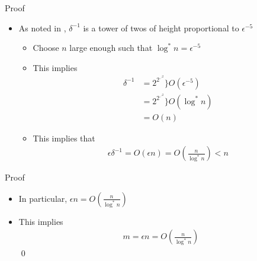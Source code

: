 \begin{frame}{Proof}
\begin{itemize}
	\item As noted in \cite{Fox11,Lee15}, $\delta^{-1}$ is a tower of twos of height proportional to $\epsilon^{-5}$
	\begin{itemize}
		\item<2-> Choose $n$ large enough such that $\log^* n = \epsilon^{-5}$
		\item<3-> This implies 
		\begin{align*}
			\delta^{-1} &= 2^{2^{\iddots^2}} \bigg\rbrace O(\epsilon^{-5})\\
			&= 2^{2^{\iddots^2}} \bigg\rbrace O(\log^* n)\\
			&= O(n)
		\end{align*}
		\item<4-> This implies that
		\begin{align*}
			\epsilon \delta^{-1} = O(\epsilon n) = O\left(\frac{n}{\log^* n}\right) < n
		\end{align*}
	\end{itemize}
\end{itemize}
\end{frame}

\begin{frame}{Proof}
\begin{itemize}
	\item In particular, $\epsilon n = O\left(\frac{n}{\log^* n}\right)$
	\item<2-> This implies
	\begin{align*}
		m = \epsilon n = O\left(\frac{n}{\log^* n}\right)
	\end{align*}
	\qed
\end{itemize}
\end{frame}



